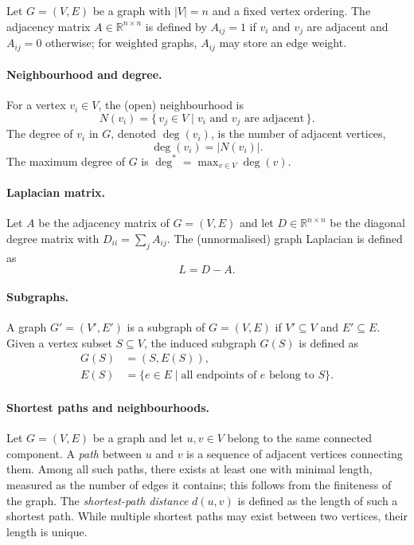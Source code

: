 \begin{definition}
Let $G=(V,E)$ be a graph with $|V|=n$ and a fixed vertex ordering.
The adjacency matrix $A\in\mathbb{R}^{n\times n}$ is defined by
$A_{ij}=1$ if \(v_i\) and \(v_j\) are adjacent and $A_{ij}=0$ otherwise;
for weighted graphs, $A_{ij}$ may store an edge weight.
\end{definition}

\paragraph{Neighbourhood and degree.}
For a vertex $v_i\in V$, the (open) neighbourhood is
\[
N(v_i)=\{\,v_j\in V \mid v_i \text{ and } v_j \text{ are adjacent}\,\}.
\]
The degree of $v_i$ in $G$, denoted $\deg(v_i)$, is the number of adjacent
vertices,
\[
\deg(v_i)=|N(v_i)|.
\]
The maximum degree of $G$ is $\deg^*=\max_{v\in V}\deg(v)$.
\paragraph{Laplacian matrix.}
Let $A$ be the adjacency matrix of $G=(V,E)$ and let
$D\in\mathbb{R}^{n\times n}$ be the diagonal degree matrix with
$D_{ii}=\sum_j A_{ij}$.
The (unnormalised) graph Laplacian is defined as
\[
L=D-A.
\]
\paragraph{Subgraphs.}
A graph $G'=(V',E')$ is a subgraph of $G=(V,E)$ if $V'\subseteq V$ and
$E'\subseteq E$.
Given a vertex subset $S\subseteq V$, the induced subgraph $G(S)$ is defined as
\[
\begin{aligned}
G(S) &= (S,E(S)), \\
E(S) &= \{e\in E \mid \text{all endpoints of } e \text{ belong to } S\}.
\end{aligned}
\]
\paragraph{Shortest paths and neighbourhoods.}
Let $G=(V,E)$ be a graph and let $u,v\in V$ belong to the same connected
component. A \emph{path} between $u$ and $v$ is a sequence of adjacent vertices
connecting them. Among all such paths, there exists at least one with minimal
length, measured as the number of edges it contains; this follows from the
finiteness of the graph. The \emph{shortest-path distance} $d(u,v)$ is defined as
the length of such a shortest path. While multiple shortest paths may exist
between two vertices, their length is unique.

